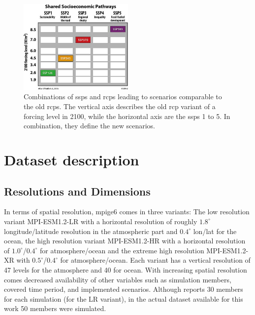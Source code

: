 \begin{figure}[bht]
  \begin{center}
    \includegraphics[width=0.5\textwidth]{figures/ssp_rcp_matrix.jpeg}
  \end{center}
  \caption{Combinations of \acp{ssp} and \acp{rcp} leading to scenarios comparable to the old \acp{rcp}. The vertical axis describes the old \ac{rcp} variant of a forcing level in 2100, while the horizontal axis are the \acp{ssp} 1 to 5. In combination, they define the new scenarios. \cite{bottinger_michael_ssp_nodate}}
  \label{fig:ssprcp}
\end{figure}


\section{Dataset description}




\subsection{Resolutions and Dimensions}
\label{sec:dataset-description}

In terms of spatial resolution, \ac{mpige6} comes in three variants: The low resolution variant MPI-ESM1.2-LR with a horizontal resolution of roughly $1.8^\circ$ longitude/latitude resolution in the atmospheric part and $0.4^\circ$ lon/lat for the ocean, the high resolution variant MPI-ESM1.2-HR with a horizontal resolution of $1.0^\circ$/$0.4^\circ$ for atmosphere/ocean and the extreme high resolution MPI-ESM1.2-XR with $0.5^\circ$/$0.4^\circ$ for atmosphere/ocean. 
Each variant has a vertical resolution of 47 levels for the atmosphere and 40 for ocean.
With increasing spatial resolution comes decreased availability of other variables such as simulation members, covered time period, and implemented scenarios. 
Although \cite{olonscheck_new_2023} reports 30 members for each simulation (for the LR variant), in the actual dataset available for this work 50 members were simulated. 


